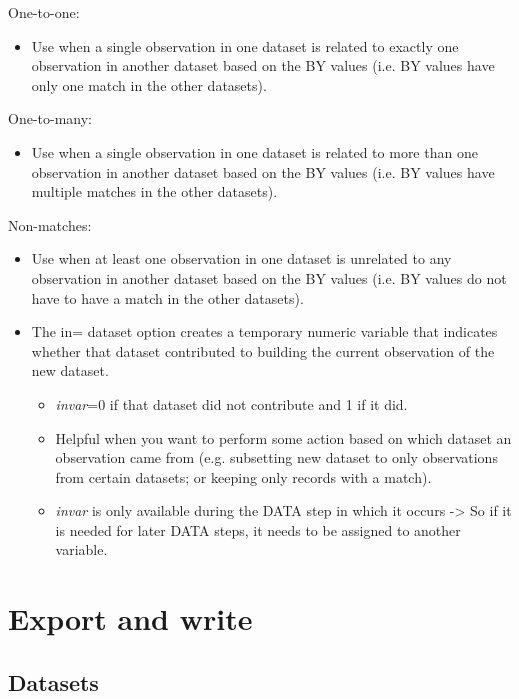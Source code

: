 \documentclass[11pt, oneside]{article}
\begin{document}
One-to-one:
\begin{itemize}
\item Use when a single observation in one dataset is related to exactly one observation in another dataset based on the BY values (i.e. BY values have only one match in the other datasets).
\end{itemize}

One-to-many:
\begin{itemize}
\item Use when a single observation in one dataset is related to more than one observation in another dataset based on the BY values (i.e. BY values have multiple matches in the other datasets).
\end{itemize}



Non-matches:
\begin{itemize}
\item Use when at least one observation in one dataset is unrelated to any observation in another dataset based on the BY values (i.e. BY values do not have to have a match in the other datasets).
\item The in= dataset option creates a temporary numeric variable that indicates whether
that dataset contributed to building the current observation of the new dataset.
	\begin{itemize}
	\item \textit{invar}=0 if that dataset did not contribute and 1 if it did.
	\item Helpful when you want to perform some action based on which dataset an observation came from (e.g. subsetting new dataset to only observations from certain datasets; or keeping only records with a match).
	\item \textit{invar} is only available during the DATA step in which it occurs -> So if it is needed for later DATA steps, it needs to be assigned to another variable.
	\end{itemize}
\end{itemize}
	

	
\section{Export and write}

\subsection{Datasets}
\end{document}
